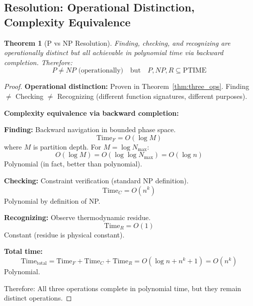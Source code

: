 \documentclass[twocolumn,10pt]{article}
\newtheorem{theorem}{Theorem}[section]
\theoremstyle{definition}
\theoremstyle{remark}
\begin{document}
\subsection{Resolution: Operational Distinction, Complexity Equivalence}

\begin{theorem}[P vs NP Resolution]
\label{thm:p_np_resolution}
Finding, checking, and recognizing are operationally distinct but all achievable in polynomial time via backward completion. Therefore:
\begin{equation}
P \neq NP \text{ (operationally)} \quad \text{but} \quad P, NP, R \subseteq \text{PTIME}
\end{equation}
\end{theorem}

\begin{proof}
\textbf{Operational distinction:} Proven in Theorem~\ref{thm:three_ops}. Finding $\neq$ Checking $\neq$ Recognizing (different function signatures, different purposes).

\vspace{0.2cm}
\noindent\textbf{Complexity equivalence via backward completion:}

\textbf{Finding:} Backward navigation in bounded phase space.
\begin{equation}
\text{Time}_F = O(\log M)
\end{equation}
where $M$ is partition depth. For $M = \log N_{\max}$:
\begin{equation}
O(\log M) = O(\log \log N_{\max}) = O(\log n)
\end{equation}
Polynomial (in fact, better than polynomial).

\vspace{0.2cm}
\noindent\textbf{Checking:} Constraint verification (standard NP definition).
\begin{equation}
\text{Time}_C = O(n^k)
\end{equation}
Polynomial by definition of NP.

\vspace{0.2cm}
\noindent\textbf{Recognizing:} Observe thermodynamic residue.
\begin{equation}
\text{Time}_R = O(1)
\end{equation}
Constant (residue is physical constant).

\vspace{0.2cm}
\noindent\textbf{Total time:}
\begin{equation}
\text{Time}_{\text{total}} = \text{Time}_F + \text{Time}_C + \text{Time}_R = O(\log n + n^k + 1) = O(n^k)
\end{equation}
Polynomial.

\vspace{0.2cm}
\noindent Therefore: All three operations complete in polynomial time, but they remain distinct operations.
\end{proof}
\end{document}
